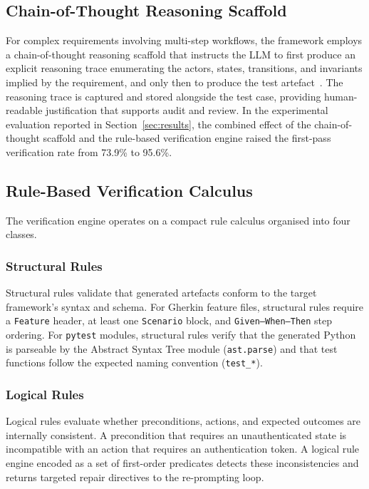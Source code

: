 \documentclass[conference]{IEEEtran}
\begin{document}
\subsection{Chain-of-Thought Reasoning Scaffold}

For complex requirements involving multi-step workflows, the framework employs a chain-of-thought reasoning scaffold that instructs the LLM to first produce an explicit reasoning trace enumerating the actors, states, transitions, and invariants implied by the requirement, and only then to produce the test artefact~\cite{cot2022}. The reasoning trace is captured and stored alongside the test case, providing human-readable justification that supports audit and review. In the experimental evaluation reported in Section~\ref{sec:results}, the combined effect of the chain-of-thought scaffold and the rule-based verification engine raised the first-pass verification rate from 73.9\% to 95.6\%.

\subsection{Rule-Based Verification Calculus}

The verification engine operates on a compact rule calculus organised into four classes.

\subsubsection{Structural Rules}
Structural rules validate that generated artefacts conform to the target framework's syntax and schema. For Gherkin feature files, structural rules require a \texttt{Feature} header, at least one \texttt{Scenario} block, and \texttt{Given--When--Then} step ordering. For \texttt{pytest} modules, structural rules verify that the generated Python is parseable by the Abstract Syntax Tree module (\texttt{ast.parse}) and that test functions follow the expected naming convention (\texttt{test\_*}).

\subsubsection{Logical Rules}
Logical rules evaluate whether preconditions, actions, and expected outcomes are internally consistent. A precondition that requires an unauthenticated state is incompatible with an action that requires an authentication token. A logical rule engine encoded as a set of first-order predicates detects these inconsistencies and returns targeted repair directives to the re-prompting loop.
\end{document}
